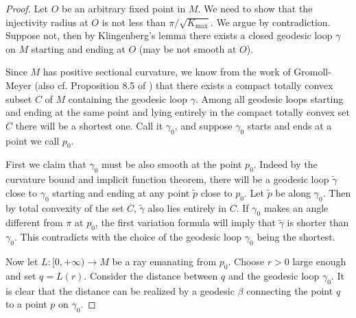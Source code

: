 \begin{proof}
Let $O$ be an arbitrary fixed point in $M$. We need to show that
the injectivity radius at $O$ is not less than
$\pi/\sqrt{K_{\max}}$. We argue by contradiction.  Suppose not,
then by Klingenberg's lemma there exists a closed geodesic loop
$\gamma$ on $M$ starting and ending at $O$ (may be not smooth at
$O$).

Since $M$ has positive sectional curvature, we know from the work
of Gromoll-Meyer \cite{GM} (also cf. Proposition 8.5 of \cite{CE})
that there exists a compact totally convex subset $C$ of $M$
containing the geodesic loop $\gamma$. Among all geodesic loops
starting and ending at the same point and lying entirely in the
compact totally convex set $C$ there will be a shortest one. Call
it $\gamma_0$, and suppose $\gamma_0$ starts and ends at a point
we call $p_0$.

First we claim that $\gamma_0$ must be also smooth at the point
$p_0$. Indeed by the curvature bound and implicit function
theorem, there will be a geodesic loop $\tilde{\gamma}$ close to
$\gamma_0$ starting and ending at any point $\tilde{p}$ close to
$p_0$. Let $\tilde{p}$ be along $\gamma_0$. Then by total
convexity of the set $C$, $\tilde{\gamma}$ also lies entirely in
$C$. If $\gamma_0$ makes an angle different from $\pi$ at $p_0$,
the first variation formula will imply that $\tilde{\gamma}$ is
shorter than $\gamma_0$. This contradicts with the choice of the
geodesic loop $\gamma_0$ being the shortest.

Now let $L:[0,+\infty)\rightarrow M$ be a ray emanating from
$p_0$. Choose $r>0$ large enough and set $q=L(r)$. Consider the
distance between $q$ and the geodesic loop $\gamma_0$. It is clear
that the distance can be realized by a geodesic $\beta$ connecting
the point $q$ to a point $p$ on $\gamma_0$.


\end{proof}
